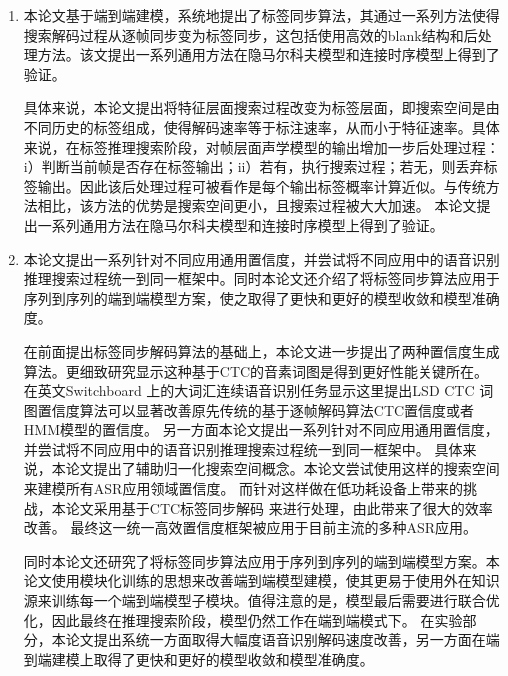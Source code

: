 \begin{enumerate}
在Switchboard 上实验表明，本论文所提出方法在取得完全一致的1-best和词图质量情况下，可以得到3-15倍加速，并在绝大部分GPU架构上进行了验证。除此之外，如果再进行多句子的并行处理，最终加速比将达到46倍。
同时本论文对这项工作进行了开源~\footnote{\url{https://github.com/chenzhehuai/kaldi/tree/gpu-decoder}},
它将与大多数Kaldi脚本相兼容。这项工作作为Kaldi工具包的一个扩展~\cite{povey2011kaldi}，完整实现了基于GPU并行计算WFST解码。

\item 本论文基于端到端建模，系统地提出了标签同步算法，其通过一系列方法使得搜索解码过程从逐帧同步变为标签同步，这包括使用高效的blank结构和后处理方法。该文提出一系列通用方法在隐马尔科夫模型和连接时序模型上得到了验证。

具体来说，本论文提出将特征层面搜索过程改变为标签层面，即搜索空间是由不同历史的标签组成，使得解码速率等于标注速率，从而小于特征速率。具体来说，在标签推理搜索阶段，对帧层面声学模型的输出增加一步后处理过程：i）判断当前帧是否存在标签输出；ii）若有，执行搜索过程；若无，则丢弃标签输出。因此该后处理过程可被看作是每个输出标签概率计算近似。与传统方法相比，该方法的优势是搜索空间更小，且搜索过程被大大加速。
本论文提出一系列通用方法在隐马尔科夫模型和连接时序模型上得到了验证。
%

\item 本论文提出一系列针对不同应用通用置信度，并尝试将不同应用中的语音识别推理搜索过程统一到同一框架中。同时本论文还介绍了将标签同步算法应用于序列到序列的端到端模型方案，使之取得了更快和更好的模型收敛和模型准确度。

在前面提出标签同步解码算法的基础上，本论文进一步提出了两种置信度生成算法。更细致研究显示这种基于CTC的音素词图是得到更好性能关键所在。
在英文Switchboard 上的大词汇连续语音识别任务显示这里提出LSD CTC 词图置信度算法可以显著改善原先传统的基于逐帧解码算法CTC置信度或者 HMM模型的置信度。
%
另一方面本论文提出一系列针对不同应用通用置信度，并尝试将不同应用中的语音识别推理搜索过程统一到同一框架中。
%
具体来说，本论文提出了辅助归一化搜索空间概念。本论文尝试使用这样的搜索空间来建模所有ASR应用领域置信度。 %
而针对这样做在低功耗设备上带来的挑战，本论文采用基于CTC标签同步解码\cite{Chen+2016} 来进行处理，由此带来了很大的效率改善。
最终这一统一高效置信度框架被应用于目前主流的多种ASR应用。

同时本论文还研究了将标签同步算法应用于序列到序列的端到端模型方案。本论文使用模块化训练的思想来改善端到端模型建模，使其更易于使用外在知识源来训练每一个端到端模型子模块。值得注意的是，模型最后需要进行联合优化，因此最终在推理搜索阶段，模型仍然工作在端到端模式下。
%
在实验部分，本论文提出系统一方面取得大幅度语音识别解码速度改善，另一方面在端到端建模上取得了更快和更好的模型收敛和模型准确度。

\end{enumerate}

